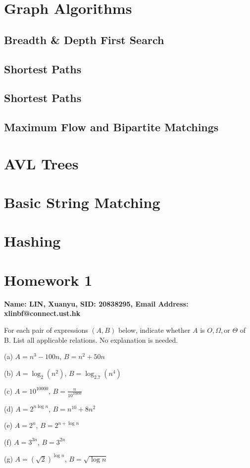 \documentclass[10pt]{article}
\begin{document}
\section{Graph Algorithms}

\subsection{Breadth \& Depth First Search}

\subsection{Shortest Paths}

\subsection{Shortest Paths}

\subsection{Maximum Flow and Bipartite Matchings}

\section{AVL Trees}

\section{Basic String Matching}

\section{Hashing}

\newpage

\section*{Homework 1}

\textbf{Name: LIN, Xuanyu, SID: 20838295, Email Address: xlinbf@connect.ust.hk}

\begin{Problem}
	
	For each pair of expressions $(A, B)$ below, indicate whether $A$
	is $O, \Omega, \text{or } \Theta$ of B. List all applicable relations. No explanation is needed.
	
	\noindent (a) $A = n^3-100n$, $B = n^2+50n$
	
	\noindent (b) $A = \log_2(n^2)$, $B = \log_{2.7}(n^4)$
	
	\noindent (c) $A = 10^{10000}$, $B = \frac{n}{10^{10000}}$
	
	\noindent (d) $A = 2^{n\log n}$, $B = n^{10}+8n^2$
	
	\noindent (e) $A = 2^n$, $B = 2^{n+\log n}$
	
	\noindent (f) $A = 3^{3n}$, $B = 3^{2n}$
	
	\noindent (g) $A = (\sqrt{2})^{\log n}$, $B = \sqrt{\log n}$
	
\end{Problem}
\end{document}
